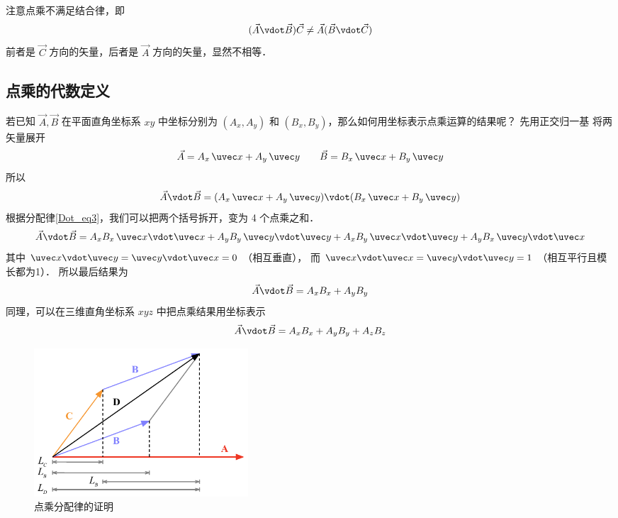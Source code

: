 注意点乘不满足结合律，即
\begin{equation}
(\vec A \vdot \vec B) \vec C \ne  \vec A (\vec B \vdot \vec C)
\end{equation}
前者是 $\vec C$ 方向的矢量，后者是 $\vec A$ 方向的矢量，显然不相等．

\subsection{点乘的代数定义}
若已知 $\vec A, \vec B$ 在平面直角坐标系 $xy$ 中坐标分别为 $(A_x, A_y)$ 和  $(B_x, B_y)$，那么如何用坐标表示点乘运算的结果呢？ 先用正交归一基 将两矢量展开 %
\begin{equation}
\vec A = A_x \,\uvec x + A_y \,\uvec y \qquad \vec B = B_x \,\uvec x + B_y \,\uvec y
\end{equation}
所以
\begin{equation}
\vec A \vdot \vec B = (A_x \,\uvec x + A_y \,\uvec y) \vdot (B_x \,\uvec x + B_y \,\uvec y)
\end{equation}
根据分配律\autoref{Dot_eq3}，我们可以把两个括号拆开，变为 4 个点乘之和． 
\begin{equation}
\vec A \vdot \vec B = A_x B_x \,\uvec x \vdot \uvec x + A_y B_y \,\uvec y \vdot \uvec y + A_x B_y \,\uvec x \vdot \uvec y + A_y B_x \,\uvec y \vdot \uvec x
\end{equation}
其中 $\uvec x \vdot \uvec y = \uvec y \vdot \uvec x = 0$ （相互垂直）， 而 $\uvec x \vdot \uvec x = \uvec y \vdot \uvec y = 1$ （相互平行且模长都为1）． 所以最后结果为
\begin{equation}
\vec A \vdot \vec B = A_x B_x + A_y B_y
\end{equation}
同理，可以在三维直角坐标系 $xyz$ 中把点乘结果用坐标表示
\begin{equation}
\vec A \vdot \vec B = A_x B_x + A_y B_y + A_z B_z	
\end{equation}

\begin{figure}[ht]
\centering
\includegraphics[width=8cm]{./figures/Dot2.pdf}
\caption{点乘分配律的证明} \label{Dot_fig2}
\end{figure}

